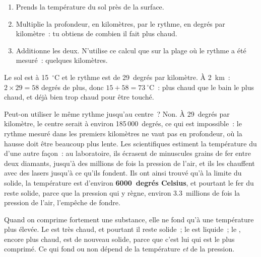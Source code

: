 \begin{method}\label{met:g6:inside-the-earth:temperature}
\begin{enumerate}
  \item Prends la température du sol près de la surface.
  \item Multiplie la profondeur, en kilomètres, par le rythme, en degrés
        par kilomètre~: tu obtiens de combien il fait plus chaud.
  \item Additionne les deux. N'utilise ce calcul que sur la plage où le
        rythme a été mesuré~: quelques kilomètres.
\end{enumerate}
\end{method}

\begin{example}\label{ex:g6:inside-the-earth:two-km}
Le sol est à 15~$^\circ$C et le rythme est de 29~degrés par kilomètre.
À 2~km~: $2 \times 29 = 58$ degrés de plus, donc $15 + 58 = 73~^\circ$C~:
plus chaud que le bain le plus chaud, et déjà bien trop chaud pour être
touché.
\end{example}

Peut-on utiliser le même rythme jusqu'au centre~? Non. À 29~degrés par
kilomètre, le centre serait à environ 185\,000~degrés, ce qui est
impossible~: le rythme mesuré dans les premiers kilomètres ne vaut pas en
profondeur, où la hausse doit être beaucoup plus lente. Les scientifiques
estiment la température du  d'une autre façon~: au laboratoire, ils
écrasent de minuscules grains de fer entre deux diamants, jusqu'à des
millions de fois la pression de l'air, et ils les chauffent avec des lasers
jusqu'à ce qu'ils fondent. Ils ont ainsi trouvé qu'à la limite du  solide, la température est d'environ
\textbf{6000~degrés Celsius}, et pourtant le fer du  reste
solide, parce que la pression qui y règne, environ 3.3~millions de fois la
pression de l'air, l'empêche de fondre.

\begin{remark}\label{rem:g6:inside-the-earth:pressure}
Quand on comprime fortement une substance, elle ne fond qu'à une
température plus élevée. Le  est très chaud, et pourtant il reste
solide~; le  est liquide~; le , encore plus
chaud, est de nouveau solide, parce que c'est lui qui est le plus
comprimé. Ce qui fond ou non dépend de la température \emph{et} de la
pression.
\end{remark}

